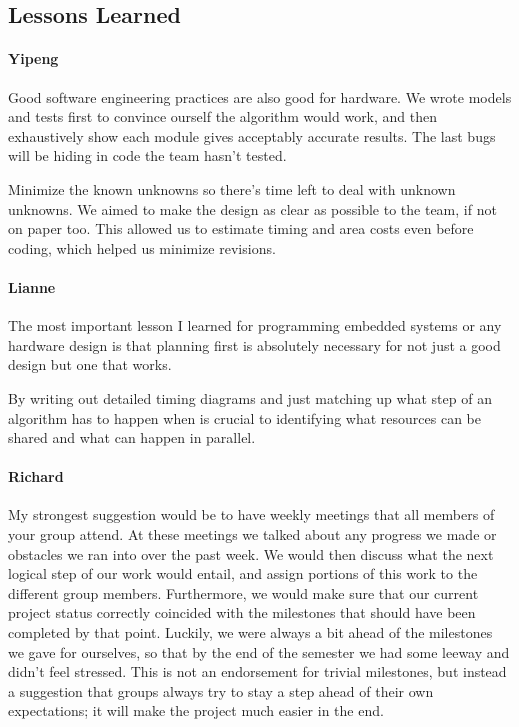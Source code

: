 \subsection{Lessons Learned}

\paragraph{Yipeng}

Good software engineering practices are also good for hardware. We wrote models and tests first to convince ourself the algorithm would work, and then exhaustively show each module gives acceptably accurate results. The last bugs will be hiding in code the team hasn't tested.

Minimize the known unknowns so there's time left to deal with unknown unknowns. We aimed to make the design as clear as possible to the team, if not on paper too. This allowed us to estimate timing and area costs even before coding, which helped us minimize revisions.

\paragraph{Lianne}

The most important lesson I learned for programming embedded systems or any hardware design 
is that planning first is absolutely necessary for not just a good design but one that works. 

By writing out detailed timing diagrams and just matching up what step of an algorithm has to 
happen when is crucial to identifying what resources can be shared and what can happen in 
parallel. 

\paragraph{Richard}

My strongest suggestion would be to have weekly meetings that all members of your group attend.
At these meetings we talked about any progress we made or obstacles we ran into over
the past week. We would then discuss what the next logical step of our work would entail, and assign
portions of this work to the different group members. Furthermore, we would make sure that our
current project status correctly coincided with the milestones that should have been completed
by that point. Luckily, we were always a bit ahead of the milestones we gave for ourselves,
so that by the end of the semester we had some leeway and didn't feel stressed. This is not
an endorsement for trivial milestones, but instead a suggestion that groups always try to stay
a step ahead of their own expectations; it will make the project much easier in the end.